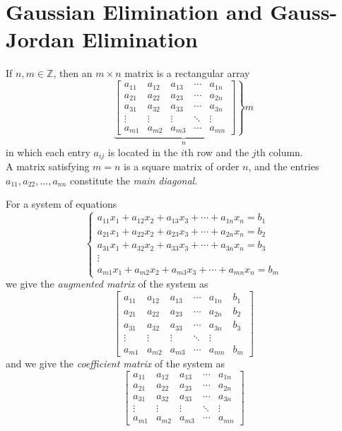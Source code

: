 \section{Gaussian Elimination and Gauss-Jordan Elimination}
\begin{definition}[Matrices]\label{def:1}
	If $n,m\in\mathbb{Z}$, then an $m\times n$ matrix is a rectangular array
	$$\underbrace{\left.\begin{bmatrix}
		a_{11}&a_{12}&a_{13}&\cdots&a_{1n}\\
		a_{21}&a_{22}&a_{23}&\cdots&a_{2n}\\
		a_{31}&a_32&a_{33}&\cdots&a_{3n}\\
		\vdots&\vdots&\vdots&\ddots&\vdots\\
		a_{m1}&a_{m2}&a_{m3}&\cdots&a_{mn}
	\end{bmatrix}\right\}m}_{n}$$
	in which each entry $a_{ij}$ is located in the $i$th row and the $j$th column.\\
	A matrix satisfying $m=n$ is a square matrix of order $n$, and the entries $a_{11},a_{22},\ldots,a_{nn}$ constitute the \emph{main diagonal}.
\end{definition}
\begin{corollary}\label{cor:1}
	For a system of equations
		$$\left\{
	\begin{array}{c}
		a_{11}x_1+a_{12}x_2+a_{13}x_3+\cdots+a_{1n}x_n=b_1\\
		a_{21}x_1+a_{22}x_2+a_{23}x_3+\cdots+a_{2n}x_n=b_2\\
		a_{31}x_1+a_{32}x_2+a_{33}x_3+\cdots+a_{3n}x_n=b_3\\
		\vdots\\
		a_{m1}x_1+a_{m2}x_2+a_{m3}x_3+\cdots+a_{mn}x_n=b_m
	\end{array}
	\right.$$
	we give the \emph{augmented matrix} of the system as
	$$\begin{bmatrix}
		a_{11}&a_{12}&a_{13}&\cdots&a_{1n}&b_1\\
		a_{21}&a_{22}&a_{23}&\cdots&a_{2n}&b_2\\
		a_{31}&a_{32}&a_{33}&\cdots&a_{3n}&b_3\\
		\vdots&\vdots&\vdots&\ddots&\vdots\\
		a_{m1}&a_{m2}&a_{m3}&\cdots&a_{mn}&b_m
	\end{bmatrix}$$
	and we give the \emph{coefficient matrix} of the system as
		$$\begin{bmatrix}
		a_{11}&a_{12}&a_{13}&\cdots&a_{1n}\\
		a_{21}&a_{22}&a_{23}&\cdots&a_{2n}\\
		a_{31}&a_{32}&a_{33}&\cdots&a_{3n}\\
		\vdots&\vdots&\vdots&\ddots&\vdots\\
		a_{m1}&a_{m2}&a_{m3}&\cdots&a_{mn}
	\end{bmatrix}$$
\end{corollary}
